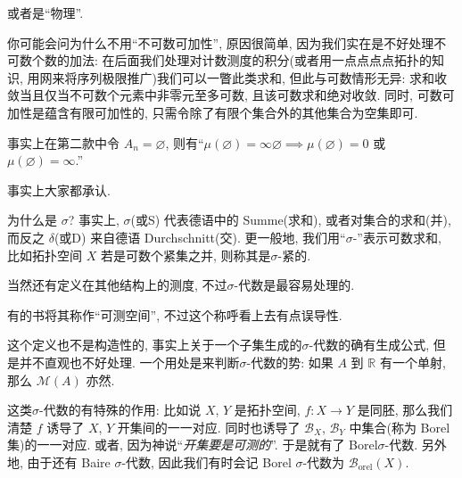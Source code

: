 \begin{alterendnote}
    或者是``物理''.
\end{alterendnote}
\begin{alterendnote}
    你可能会问为什么不用``不可数可加性'', 原因很简单, 因为我们实在是不好处理不可数个数的加法: 在后面我们处理对计数测度的积分(或者用一点点点点拓扑的知识, 用网来将序列极限推广)我们可以一瞥此类求和, 但此与可数情形无异: 求和收敛当且仅当不可数个元素中非零元至多可数, 且该可数求和绝对收敛. 同时, 可数可加性是蕴含有限可加性的, 只需令除了有限个集合外的其他集合为空集即可.
\end{alterendnote}
\begin{alterendnote}
    事实上在第二款中令 $A_n=\varnothing$, 则有``$\mu (\varnothing)=\infty\varnothing \implies \mu (\varnothing)=0$ 或 $\mu (\varnothing)=\infty$.''
\end{alterendnote}
\begin{alterendnote}
    事实上大家都承认.
\end{alterendnote}
\begin{alterendnote}
    为什么是 $\sigma $? 事实上, $\sigma $(或S) 代表德语中的 Summe(求和), 或者对集合的求和(并), 而反之 $\delta $(或D) 来自德语 Durchschnitt(交). 更一般地, 我们用``$\sigma $-''表示可数求和, 比如拓扑空间 $X$ 若是可数个紧集之并, 则称其是\;$\sigma$-紧的.
\end{alterendnote}
\begin{alterendnote}
    当然还有定义在其他结构上的测度, 不过\;$\sigma $-代数是最容易处理的.
\end{alterendnote}
\begin{alterendnote}
    有的书将其称作``可测空间'', 不过这个称呼看上去有点误导性.
\end{alterendnote}
\begin{alterendnote}
    这个定义也不是构造性的, 事实上关于一个子集生成的\;$\sigma $-代数的确有生成公式, 但是并不直观也不好处理. 一个用处是来判断\;$\sigma $-代数的势: 如果 $A$ 到 $\mathbb R$ 有一个单射, 那么 $\mathcal M(A)$ 亦然.
\end{alterendnote}
\begin{alterendnote}
    这类\;$\sigma $-代数的有特殊的作用: 比如说 $X$, $Y$ 是拓扑空间, $f:X\to Y$ 是同胚, 那么我们清楚 $f$ 诱导了 $X$, $Y$ 开集间的一一对应. 同时也诱导了 $\mathcal B_X$, $\mathcal B_Y$ 中集合(称为 Borel 集)的一一对应. 或者, 因为神说``\emph{开集要是可测的}''. 于是就有了 Borel\;$\sigma $-代数. 另外地, 由于还有 Baire $\sigma $-代数, 因此我们有时会记 Borel $\sigma $-代数为 $\mathcal{B}_{\mathrm{orel}}(X)$.
\end{alterendnote}

